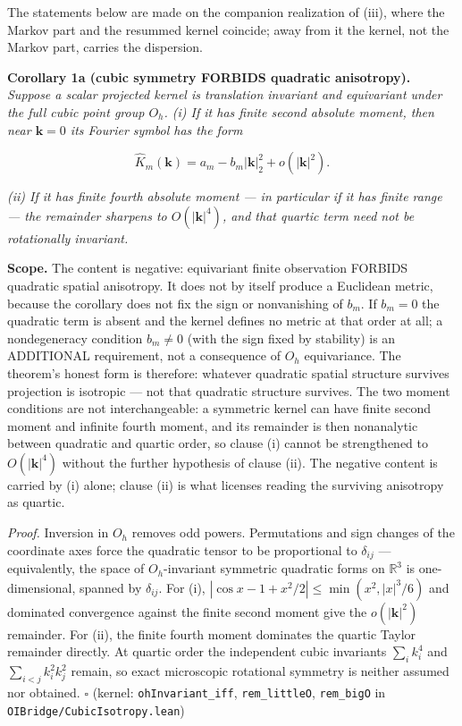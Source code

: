 \documentclass[
]{article}
\begin{document}
The statements below are made on the companion realization of (iii),
where the Markov part and the resummed kernel coincide; away from it the
kernel, not the Markov part, carries the dispersion.

\textbf{Corollary 1a (cubic symmetry FORBIDS quadratic anisotropy).}
\emph{Suppose a scalar projected kernel is translation invariant and
equivariant under the full cubic point group \(O_h\). (i) If it has
finite second absolute moment, then near \(\mathbf k=0\) its Fourier
symbol has the form}

\[\widehat K_m(\mathbf k)=a_m-b_m|\mathbf k|_2^2+o(|\mathbf k|^2).\]

\emph{(ii) If it has finite fourth absolute moment --- in particular if
it has finite range --- the remainder sharpens to \(O(|\mathbf k|^4)\),
and that quartic term need not be rotationally invariant.}

\textbf{Scope.} The content is negative: equivariant finite observation
FORBIDS quadratic spatial anisotropy. It does not by itself produce a
Euclidean metric, because the corollary does not fix the sign or
nonvanishing of \(b_m\). If \(b_m=0\) the quadratic term is absent and
the kernel defines no metric at that order at all; a nondegeneracy
condition \(b_m\neq0\) (with the sign fixed by stability) is an
ADDITIONAL requirement, not a consequence of \(O_h\) equivariance. The
theorem's honest form is therefore: whatever quadratic spatial structure
survives projection is isotropic --- not that quadratic structure
survives. The two moment conditions are not interchangeable: a symmetric
kernel can have finite second moment and infinite fourth moment, and its
remainder is then nonanalytic between quadratic and quartic order, so
clause (i) cannot be strengthened to \(O(|\mathbf k|^4)\) without the
further hypothesis of clause (ii). The negative content is carried by
(i) alone; clause (ii) is what licenses reading the surviving anisotropy
as quartic.

\emph{Proof.} Inversion in \(O_h\) removes odd powers. Permutations and
sign changes of the coordinate axes force the quadratic tensor to be
proportional to \(\delta_{ij}\) --- equivalently, the space of
\(O_h\)-invariant symmetric quadratic forms on \(\mathbb R^3\) is
one-dimensional, spanned by \(\delta_{ij}\). For (i),
\(|\cos x-1+x^2/2|\le\min(x^2,|x|^3/6)\) and dominated convergence
against the finite second moment give the \(o(|\mathbf k|^2)\)
remainder. For (ii), the finite fourth moment dominates the quartic
Taylor remainder directly. At quartic order the independent cubic
invariants \(\sum_i k_i^4\) and \(\sum_{i<j}k_i^2k_j^2\) remain, so
exact microscopic rotational symmetry is neither assumed nor obtained.
\(\square\) (kernel: \texttt{ohInvariant\_iff}, \texttt{rem\_littleO},
\texttt{rem\_bigO} in \texttt{OIBridge/CubicIsotropy.lean})
\end{document}
